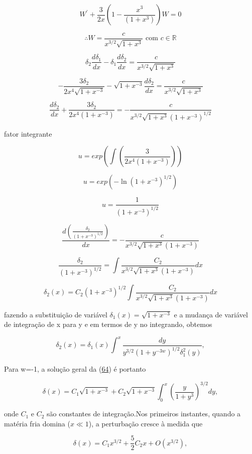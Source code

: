 \documentclass[a4paper,12pt]{article}
\begin{document}
$$W^\prime + \dfrac{3}{2x}\left(1 - \dfrac{x^3}{(1+x^3)}\right)W  =0$$

$$\therefore W = \dfrac{c}{x^{3/2}\sqrt{1+x^3}} \text{ 	com } c \in \mathbb{R}$$

$$\delta_2\dfrac{d\delta_1}{dx} - \delta_1\dfrac{d\delta_2}{dx} = \dfrac{c}{x^{3/2}\sqrt{1+x^3}}$$

$$-\dfrac{3\delta_2}{2x^4\sqrt{1+x^{-3}}} - \sqrt{1+x^{-3}}\dfrac{d\delta_2}{dx} = \dfrac{c}{x^{3/2}\sqrt{1+x^3}}$$

$$\dfrac{d\delta_2}{dx}+\dfrac{3\delta_2}{2x^4(1+x^{-3})} = -\dfrac{c}{x^{3/2}\sqrt{1+x^3}(1+x^{-3})^{1/2}}$$

fator integrante 

$$u= exp \left(\int \left(\dfrac{3}{2x^4(1+x^{-3})} \right)\right)$$

$$u = exp \left( -\ln(1+x^{-3})^{1/2}\right)$$

$$u = \dfrac{1}{(1+x^{-3})^{1/2}}$$

$$\dfrac{d(\frac{\delta_2}{(1+x^{-3})^{1/2}})}{dx} = -\dfrac{c}{x^{3/2}\sqrt{1+x^3}(1+x^{-3})}$$

$$\dfrac{\delta_2}{(1+x^{-3})^{1/2}} = \int\dfrac{C_2}{x^{3/2}\sqrt{1+x^3}(1+x^{-3})} dx$$

$$\delta_2(x) =C_2(1+x^{-3})^{1/2} \int\dfrac{C_2}{x^{3/2}\sqrt{1+x^3}(1+x^{-3})} dx$$

fazendo a substituição de variável $\delta_1 (x) = \sqrt{1+x^{-3}}$ e a mudança de variável de integração de x para y e em termos de y no integrando, obtemos

\begin{equation}\label{eq66}
	\delta_2 (x) = \delta_1 (x)\int^x \dfrac{dy}{y^{3/2}(1+y^{-3w})^{1/2}\delta^2_1 (y)},
\end{equation}

Para w=-1, a solução geral da (\hyperref[eq64]{64}) é portanto

\begin{equation}\label{eq67}
	\delta (x) = C_1 \sqrt{1+x^{-3}} + C_2\sqrt{1+x^{-3}}\int^x_0 \left( \dfrac{y}{1+y^3}\right)^{3/2} dy,
\end{equation}

onde $C_1$ e $C_2$ são constantes de integração.Nos primeiros instantes, quando a matéria fria domina ($x \ll 1$), a perturbação cresce à medida que

\begin{equation}\label{eq68}
	\delta (x) = C_1x^{3/2} +\frac{5}{2} C_2x + O(x^{3/2}),
\end{equation}
\end{document}
